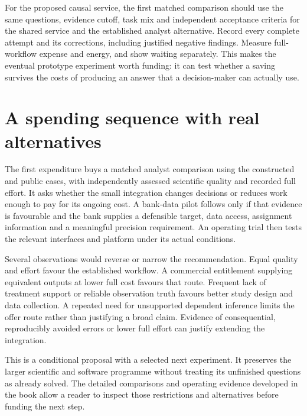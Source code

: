 For the proposed causal service, the first matched comparison should use
the same questions, evidence cutoff, task mix and independent acceptance
criteria for the shared service and the established analyst alternative.
Record every complete attempt and its corrections, including justified
negative findings. Measure full-workflow expense and energy, and show
waiting separately. This makes the eventual prototype experiment worth
funding: it can test whether a saving survives the costs of producing an
answer that a decision-maker can actually use.

\section{A spending sequence with real alternatives}
The first expenditure buys a matched analyst comparison using the
constructed and public cases, with independently assessed scientific
quality and recorded full effort. It asks whether the small integration
changes decisions or reduces work enough to pay for its ongoing cost.
A bank-data pilot follows only if that evidence is favourable and the
bank supplies a defensible target, data access, assignment information
and a meaningful precision requirement. An operating trial then tests
the relevant interfaces and platform under its actual conditions.

Several observations would reverse or narrow the recommendation. Equal
quality and effort favour the established workflow. A commercial
entitlement supplying equivalent outputs at lower full cost favours
that route. Frequent lack of treatment support or reliable observation
truth favours better study design and data collection. A repeated
need for unsupported dependent inference limits the offer route rather
than justifying a broad claim. Evidence of consequential, reproducibly
avoided errors or lower full effort can justify extending the integration.

This is a conditional proposal with a selected next experiment. It
preserves the larger scientific and software programme without treating
its unfinished questions as already solved. The detailed comparisons
and operating evidence developed in the book allow a reader to inspect those
restrictions and alternatives before funding the next step.



\backmatter
\clearpage{}
{}





